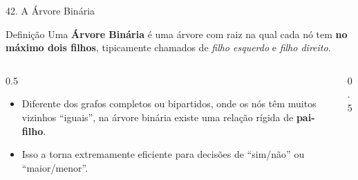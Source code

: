 \documentclass[9pt]{beamer}
\begin{document}
    \begin{frame}{42. A Árvore Binária}
        \begin{block}{Definição}
            Uma \textbf{Árvore Binária} é uma árvore com raiz na qual cada nó tem \textbf{no máximo dois filhos}, tipicamente chamados de \textit{filho esquerdo} e \textit{filho direito}.
        \end{block}
        \vspace{0.3cm}
        \begin{columns}
            \begin{column}{0.5\textwidth}
                \begin{itemize}
                    \item Diferente dos grafos completos ou bipartidos, onde os nós têm muitos vizinhos ``iguais'', na árvore binária existe uma relação rígida de \textbf{pai-filho}.
                    \item Isso a torna extremamente eficiente para decisões de ``sim/não'' ou ``maior/menor''.
                \end{itemize}
            \end{column}
            \begin{column}{0.5\textwidth}
                \centering
            \end{column}
        \end{columns}
    \end{frame}
\end{document}
